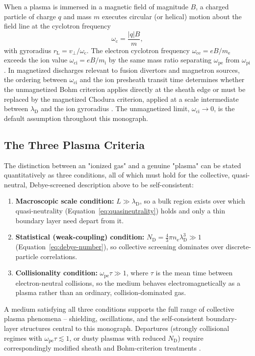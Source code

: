 When a plasma is immersed in a magnetic field of magnitude $B$, a charged particle of charge $q$ and mass $m$ executes circular (or helical) motion about the field line at the cyclotron frequency
\begin{equation}
\omega_{\mathrm{c}} = \frac{|q| B}{m},
\label{eq:cyclotron-frequency}
\end{equation}
with gyroradius $r_{\mathrm{L}} = v_{\perp}/\omega_{\mathrm{c}}$. The electron cyclotron frequency $\omega_{\mathrm{ce}} = eB/m_{\mathrm{e}}$ exceeds the ion value $\omega_{\mathrm{ci}} = eB/m_{\mathrm{i}}$ by the same mass ratio separating $\omega_{\mathrm{pe}}$ from $\omega_{\mathrm{pi}}$. In magnetized discharges relevant to fusion divertors and magnetron sources, the ordering between $\omega_{\mathrm{ci}}$ and the ion presheath transit time determines whether the unmagnetized Bohm criterion applies directly at the sheath edge or must be replaced by the magnetized Chodura criterion, applied at a scale intermediate between $\lambda_{\mathrm{D}}$ and the ion gyroradius \cite{ref0017,ref0018}. The unmagnetized limit, $\omega_{\mathrm{ci}} \to 0$, is the default assumption throughout this monograph.

\subsection{The Three Plasma Criteria}

The distinction between an "ionized gas" and a genuine "plasma" can be stated quantitatively as three conditions, all of which must hold for the collective, quasi-neutral, Debye-screened description above to be self-consistent:
\begin{enumerate}
\item \textbf{Macroscopic scale condition:} $L \gg \lambda_{\mathrm{D}}$, so a bulk region exists over which quasi-neutrality (Equation~\eqref{eq:quasineutrality}) holds and only a thin boundary layer need depart from it.
\item \textbf{Statistical (weak-coupling) condition:} $N_{\mathrm{D}} = \tfrac{4}{3}\pi n_{\mathrm{e}} \lambda_{\mathrm{D}}^{3} \gg 1$ (Equation~\eqref{eq:debye-number}), so collective screening dominates over discrete-particle correlations.
\item \textbf{Collisionality condition:} $\omega_{\mathrm{pe}} \tau \gg 1$, where $\tau$ is the mean time between electron-neutral collisions, so the medium behaves electromagnetically as a plasma rather than an ordinary, collision-dominated gas.
\end{enumerate}
A medium satisfying all three conditions supports the full range of collective plasma phenomena -- shielding, oscillations, and the self-consistent boundary-layer structures central to this monograph. Departures (strongly collisional regimes with $\omega_{\mathrm{pe}}\tau \lesssim 1$, or dusty plasmas with reduced $N_{\mathrm{D}}$) require correspondingly modified sheath and Bohm-criterion treatments \cite{ref0009,ref0024}.

